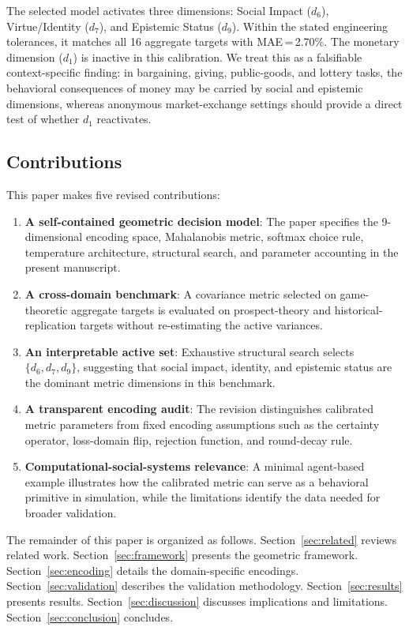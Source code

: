 \documentclass[journal]{IEEEtran}
\begin{document}
The selected model activates three dimensions: Social Impact ($d_6$), Virtue/Identity ($d_7$), and Epistemic Status ($d_9$).
Within the stated engineering tolerances, it matches all 16 aggregate targets with MAE\,=\,2.70\%.
The monetary dimension ($d_1$) is inactive in this calibration.
We treat this as a falsifiable context-specific finding: in bargaining, giving, public-goods, and lottery tasks, the behavioral consequences of money may be carried by social and epistemic dimensions, whereas anonymous market-exchange settings should provide a direct test of whether $d_1$ reactivates.

\subsection{Contributions}
This paper makes five revised contributions:
\begin{enumerate}
    \item \textbf{A self-contained geometric decision model}: The paper specifies the 9-dimensional encoding space, Mahalanobis metric, softmax choice rule, temperature architecture, structural search, and parameter accounting in the present manuscript.
    \item \textbf{A cross-domain benchmark}: A covariance metric selected on game-theoretic aggregate targets is evaluated on prospect-theory and historical-replication targets without re-estimating the active variances.
    \item \textbf{An interpretable active set}: Exhaustive structural search selects $\{d_6,d_7,d_9\}$, suggesting that social impact, identity, and epistemic status are the dominant metric dimensions in this benchmark.
    \item \textbf{A transparent encoding audit}: The revision distinguishes calibrated metric parameters from fixed encoding assumptions such as the certainty operator, loss-domain flip, rejection function, and round-decay rule.
    \item \textbf{Computational-social-systems relevance}: A minimal agent-based example illustrates how the calibrated metric can serve as a behavioral primitive in simulation, while the limitations identify the data needed for broader validation.
\end{enumerate}

The remainder of this paper is organized as follows.
Section~\ref{sec:related} reviews related work.
Section~\ref{sec:framework} presents the geometric framework.
Section~\ref{sec:encoding} details the domain-specific encodings.
Section~\ref{sec:validation} describes the validation methodology.
Section~\ref{sec:results} presents results.
Section~\ref{sec:discussion} discusses implications and limitations.
Section~\ref{sec:conclusion} concludes.
\end{document}
